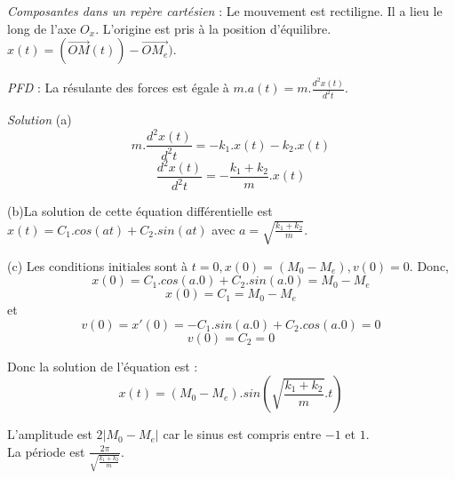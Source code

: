 \documentclass[]{book}
\theoremstyle{definition}
\begin{document}
\emph{Composantes dans un rep\`ere cart\'esien} : Le mouvement est rectiligne.
Il a lieu le long de l'axe $O_x$. L'origine est pris \`a la position d'\'equilibre. $x(t) = (\overrightarrow{OM}(t)) - \overrightarrow{OM_{e}})$.


\emph{PFD} : La r\'esulante des forces est \'egale \`a $m.a(t) = m.\frac{d^2x(t)}{d^2t}$. 


\emph{Solution}
(a) \\
$$m.\frac{d^2x(t)}{d^2t} = -k_1.x(t)-k_2.x(t)$$
$$\frac{d^2x(t)}{d^2t} = -\frac{k_1+k_2}{m}.x(t)$$



(b)La solution de cette \'equation diff\'erentielle est $x(t) = C_1.cos(at) + C_2.sin(at)$ avec $a = \sqrt{\frac{k_1+k_2}{m}}$.


(c) Les conditions initiales sont \`a $t=0, x(0) = (M_0-M_e), v(0) = 0$. Donc,
$$x(0) = C_1.cos(a.0) + C_2.sin(a.0) = M_0-M_e$$
$$x(0) = C_1 = M_0-M_e$$
et
$$v(0) = x'(0) = -C_1.sin(a.0) +C_2.cos(a.0) = 0$$
$$v(0) = C_2 = 0$$

Donc la solution de l'\'equation est :
$$x(t) = (M_0-M_e).sin(\sqrt{\frac{k_1+k_2}{m}}.t)$$

L'amplitude est $2|M_0-M_e|$ car le sinus est compris entre $-1$ et $1$. \\
La p\'eriode est $\frac{2\pi}{\sqrt{\frac{k_1+k_2}{m}}}$.
\end{document}
